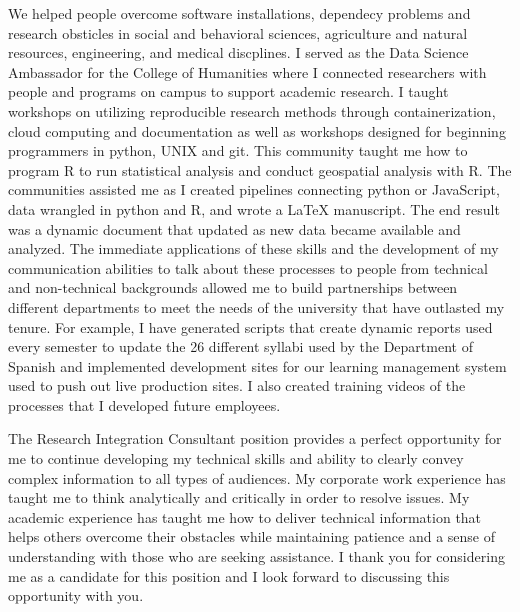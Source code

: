 \documentclass[12pt, letterpaper]{awesome-cv} %
\newcommand{\posname}{Research Integration Consultant } %
\begin{document}
\begin{cvletter}
We helped people overcome software installations, dependecy problems and research obsticles in social and behavioral sciences, agriculture and natural resources, engineering, and medical discplines. I served as the Data Science Ambassador for the College of Humanities where I connected researchers with people and programs on campus to support academic research. I taught workshops on utilizing reproducible research methods through containerization, cloud computing and documentation as well as workshops designed for beginning programmers in python, UNIX and git. This community %
taught me how to program R to run statistical analysis and conduct geospatial analysis with R. The communities assisted me as I created pipelines connecting python or JavaScript, data wrangled in python and R, and wrote a LaTeX manuscript. The end result was a dynamic document that updated as new data became available and analyzed. %
The immediate applications of these skills and the development of my communication abilities to talk about these processes to people from technical and non-technical backgrounds allowed me %
to build partnerships between different departments to meet the needs of the university that have outlasted my tenure. %
For example, I have generated scripts that create dynamic reports used every semester to update the 26 different syllabi used by the Department of Spanish and implemented development sites for our learning management system used to push out live production sites. I also created training videos of the processes that I developed future employees.

The \posname position provides a perfect opportunity for me to continue developing my technical skills and ability to clearly convey complex information to all types of audiences. My corporate work experience has taught me to think analytically and critically in order to resolve issues. My academic experience has taught me how to deliver technical information that helps others overcome their obstacles while maintaining patience and a sense of understanding with those who are seeking assistance. I thank you for considering me as a candidate for this position and I look forward to discussing this opportunity with you.



\end{cvletter}


\makeletterclosing %
\end{document}
